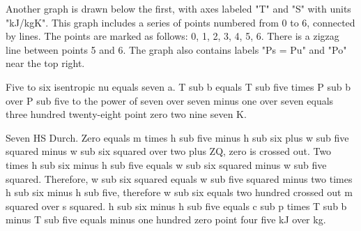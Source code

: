 Another graph is drawn below the first, with axes labeled "T" and "S" with units "kJ/kgK". This graph includes a series of points numbered from 0 to 6, connected by lines. The points are marked as follows: 0, 1, 2, 3, 4, 5, 6. There is a zigzag line between points 5 and 6. The graph also contains labels "Ps = Pu" and "Po" near the top right.

Five to six isentropic nu equals seven a.  
T sub b equals T sub five times P sub b over P sub five to the power of seven over seven minus one over seven equals three hundred twenty-eight point zero two nine seven K.

Seven HS Durch.  
Zero equals m times h sub five minus h sub six plus w sub five squared minus w sub six squared over two plus ZQ, zero is crossed out.  
Two times h sub six minus h sub five equals w sub six squared minus w sub five squared.  
Therefore, w sub six squared equals w sub five squared minus two times h sub six minus h sub five, therefore w sub six equals two hundred crossed out m squared over s squared.  
h sub six minus h sub five equals c sub p times T sub b minus T sub five equals minus one hundred zero point four five kJ over kg.